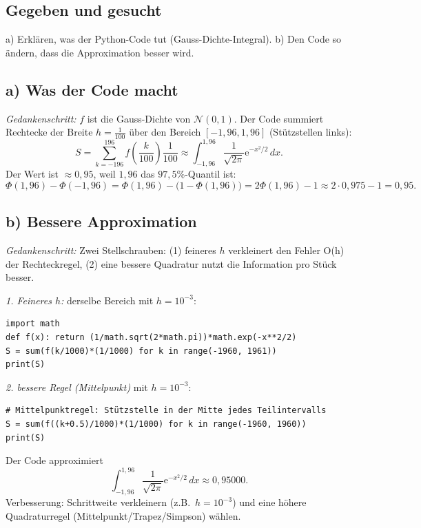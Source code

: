 
\subsection*{Gegeben und gesucht}
a) Erklären, was der Python-Code tut (Gauss-Dichte-Integral). b) Den Code so
ändern, dass die Approximation besser wird.

\subsection*{a) Was der Code macht}
\emph{Gedankenschritt:} $f$ ist die Gauss-Dichte von $\mathcal N(0,1)$. Der
Code summiert Rechtecke der Breite $h=\frac1{100}$ über den Bereich
$[-1{,}96,1{,}96]$ (Stützstellen links):
\begin{equation*}
  S=\sum_{k=-196}^{196} f\!\left(\frac{k}{100}\right)\frac{1}{100}
  \approx \int_{-1{,}96}^{1{,}96}
  \frac{1}{\sqrt{2\pi}}\mathrm e^{-x^2/2}\,dx .
\end{equation*}
Der Wert ist $\approx0{,}95$, weil $1{,}96$ das $97{,}5\%$-Quantil ist:
\begin{equation*}
  \Phi(1{,}96)-\Phi(-1{,}96)
  =\Phi(1{,}96)-\bigl(1-\Phi(1{,}96)\bigr)
  =2\Phi(1{,}96)-1\approx2\cdot0{,}975-1=0{,}95 .
\end{equation*}

\subsection*{b) Bessere Approximation}
\emph{Gedankenschritt:} Zwei Stellschrauben: (1) feineres $h$ verkleinert
den Fehler O(h) der Rechteckregel, (2) eine bessere Quadratur nutzt die
Information pro Stück besser.

\emph{1. Feineres $h$:} derselbe Bereich mit $h=10^{-3}$:
\begin{verbatim}
import math
def f(x): return (1/math.sqrt(2*math.pi))*math.exp(-x**2/2)
S = sum(f(k/1000)*(1/1000) for k in range(-1960, 1961))
print(S)
\end{verbatim}

\emph{2. bessere Regel (Mittelpunkt)} mit $h=10^{-3}$:
\begin{verbatim}
# Mittelpunktregel: Stützstelle in der Mitte jedes Teilintervalls
S = sum(f((k+0.5)/1000)*(1/1000) for k in range(-1960, 1960))
print(S)
\end{verbatim}

\begin{ergebnis}
Der Code approximiert
\[
  \int_{-1{,}96}^{1{,}96}\frac1{\sqrt{2\pi}}\mathrm e^{-x^2/2}\,dx
  \approx0{,}95000 .
\]
Verbesserung: Schrittweite verkleinern (z.B.\ $h=10^{-3}$) und eine höhere
Quadraturregel (Mittelpunkt/Trapez/Simpson) wählen.
\end{ergebnis}

